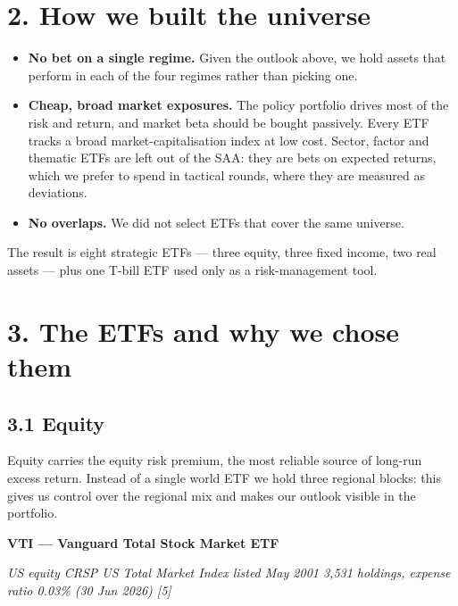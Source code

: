 \documentclass[
]{article}
\begin{document}
\hypertarget{how-we-built-the-universe}{%
\section{2. How we built the universe}\label{how-we-built-the-universe}}

\begin{itemize}
\item
  \textbf{No bet on a single regime.} Given the outlook above, we hold
  assets that perform in each of the four regimes rather than picking
  one.
\item
  \textbf{Cheap, broad market exposures.} The policy portfolio drives
  most of the risk and return, and market beta should be bought
  passively. Every ETF tracks a broad market-capitalisation index at low
  cost. Sector, factor and thematic ETFs are left out of the SAA: they
  are bets on expected returns, which we prefer to spend in tactical
  rounds, where they are measured as deviations.
\item
  \textbf{No overlaps.} We did not select ETFs that cover the same
  universe.
\end{itemize}

The result is eight strategic ETFs --- three equity, three fixed income,
two real assets --- plus one T-bill ETF used only as a risk-management
tool.

\hypertarget{the-etfs-and-why-we-chose-them}{%
\section{3. The ETFs and why we chose
them}\label{the-etfs-and-why-we-chose-them}}

\hypertarget{equity}{%
\subsection{3.1 Equity}\label{equity}}

Equity carries the equity risk premium, the most reliable source of
long-run excess return. Instead of a single world ETF we hold three
regional blocks: this gives us control over the regional mix and makes
our outlook visible in the portfolio.

\textbf{VTI --- Vanguard Total Stock Market ETF}

\emph{US equity \textperiodcentered{} CRSP US Total Market Index \textperiodcentered{} listed May 2001 \textperiodcentered{} 3,531
holdings, expense ratio 0.03\% (30 Jun 2026) {[}5{]}}
\end{document}
